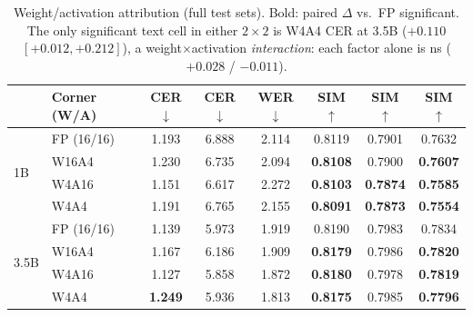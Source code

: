 \begin{table}[t]
\centering
\small
\setlength{\tabcolsep}{5pt}
\begin{tabular}{llcccccc}
\toprule
& Corner (W/A) & \zh{} CER$\downarrow$ & \hard{} CER$\downarrow$ & \en{} WER$\downarrow$ & \zh{} SIM$\uparrow$ & \hard{} SIM$\uparrow$ & \en{} SIM$\uparrow$ \\
\midrule
\multirow{4}{*}{1B}
& FP (16/16)   & 1.193 & 6.888 & 2.114 & 0.8119 & 0.7901 & 0.7632 \\
& W16A4        & 1.230 & 6.735 & 2.094 & \textbf{0.8108} & 0.7900 & \textbf{0.7607} \\
& W4A16        & 1.151 & 6.617 & 2.272 & \textbf{0.8103} & \textbf{0.7874} & \textbf{0.7585} \\
& W4A4         & 1.191 & 6.765 & 2.155 & \textbf{0.8091} & \textbf{0.7873} & \textbf{0.7554} \\
\midrule
\multirow{4}{*}{3.5B}
& FP (16/16)   & 1.139 & 5.973 & 1.919 & 0.8190 & 0.7983 & 0.7834 \\
& W16A4        & 1.167 & 6.186 & 1.909 & \textbf{0.8179} & 0.7986 & \textbf{0.7820} \\
& W4A16        & 1.127 & 5.858 & 1.872 & \textbf{0.8180} & 0.7978 & \textbf{0.7819} \\
& W4A4         & \textbf{1.249} & 5.936 & 1.813 & \textbf{0.8175} & 0.7985 & \textbf{0.7796} \\
\bottomrule
\end{tabular}
\caption{Weight/activation attribution (full test sets). Bold: paired $\Delta$ vs.\ FP significant. The only significant text cell in either $2{\times}2$ is W4A4 \zh{} CER at 3.5B ($+0.110$ $[+0.012,+0.212]$), a weight$\times$activation \emph{interaction}: each factor alone is ns ($+0.028$ / $-0.011$).}
\label{tab:attr}
\end{table}

